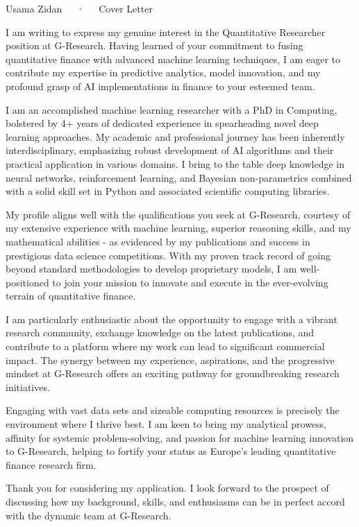 \documentclass[11pt, a4paper]{awesome-cv}
\begin{document}
\makecvheader[R]

\makecvfooter
  {}
  {Usama Zidan~~~·~~~Cover Letter}
  {}

\makelettertitle

\begin{cvletter}


I am writing to express my genuine interest in the Quantitative Researcher position at G-Research. Having learned of your commitment to fusing quantitative finance with advanced machine learning techniques, I am eager to contribute my expertise in predictive analytics, model innovation, and my profound grasp of AI implementations in finance to your esteemed team.


I am an accomplished machine learning researcher with a PhD in Computing, bolstered by 4+ years of dedicated experience in spearheading novel deep learning approaches. My academic and professional journey has been inherently interdisciplinary, emphasizing robust development of AI algorithms and their practical application in various domains. I bring to the table deep knowledge in neural networks, reinforcement learning, and Bayesian non-parametrics combined with a solid skill set in Python and associated scientific computing libraries.


My profile aligns well with the qualifications you seek at G-Research, courtesy of my extensive experience with machine learning, superior reasoning skills, and my mathematical abilities - as evidenced by my publications and success in prestigious data science competitions. With my proven track record of going beyond standard methodologies to develop proprietary models, I am well-positioned to join your mission to innovate and execute in the ever-evolving terrain of quantitative finance.

I am particularly enthusiastic about the opportunity to engage with a vibrant research community, exchange knowledge on the latest publications, and contribute to a platform where my work can lead to significant commercial impact. The synergy between my experience, aspirations, and the progressive mindset at G-Research offers an exciting pathway for groundbreaking research initiatives.

Engaging with vast data sets and sizeable computing resources is precisely the environment where I thrive best. I am keen to bring my analytical prowess, affinity for systemic problem-solving, and passion for machine learning innovation to G-Research, helping to fortify your status as Europe's leading quantitative finance research firm.

Thank you for considering my application. I look forward to the prospect of discussing how my background, skills, and enthusiasms can be in perfect accord with the dynamic team at G-Research.

\end{cvletter}

\makeletterclosing
\end{document}

